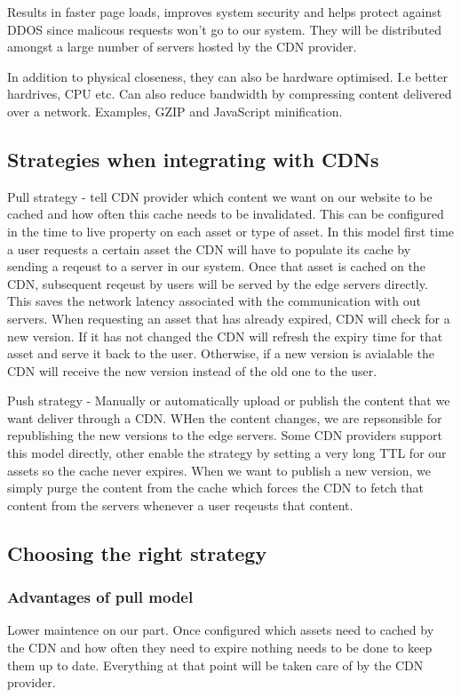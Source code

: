\documentclass[a4paper, 11pt]{book}
\begin{document}
    Results in faster page loads, improves system security and helps protect against DDOS since malicous requests won't go to our system.
    They will be distributed amongst a large number of servers hosted by the CDN provider.

    In addition to physical closeness, they can also be hardware optimised. I.e better hardrives, CPU etc.
    Can also reduce bandwidth by compressing content delivered over a network.
    Examples, GZIP and JavaScript minification.

    \subsection{Strategies when integrating with CDNs}
    Pull strategy - tell CDN provider which content we want on our website to be cached and how often this cache needs to be invalidated.
    This can be configured in the time to live property on each asset or type of asset.
    In this model first time a user requests a certain asset the CDN will have to populate its cache by sending a reqeust to a server in our system.
    Once that asset is cached on the CDN, subsequent reqeust by users will be served by the edge servers directly.
    This saves the network latency associated with the communication with out servers.
    When requesting an asset that has already expired, CDN will check for a new version. If it has not changed the CDN will refresh the expiry time for that asset and serve it back to the user.
    Otherwise, if a new version is avialable the CDN will receive the new version instead of the old one to the user.

    Push strategy - Manually or automatically upload or publish the content that we want deliver through a CDN.
    WHen the content changes, we are repsonsible for republishing the new versions to the edge servers.
    Some CDN providers support this model directly, other enable the strategy by setting a very long TTL for our assets so the cache never expires.
    When we want to publish a new version, we simply purge the content from the cache which forces the CDN to fetch that content from the servers whenever a user reqeusts that content.

    \subsection{Choosing the right strategy}

    \subsubsection{Advantages of pull model}
    Lower maintence on our part. Once configured which assets need to cached by the CDN and how often they need to expire nothing needs to be done to keep them up to date.
    Everything at that point will be taken care of by the CDN provider.
\end{document}
